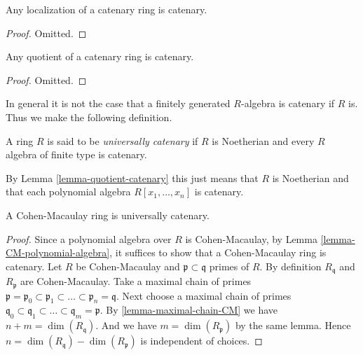 \begin{lemma}
\label{lemma-localization-catenary}
Any localization of a catenary ring is catenary.
\end{lemma}

\begin{proof}
Omitted.
\end{proof}

\begin{lemma}
\label{lemma-quotient-catenary}
Any quotient of a catenary ring is catenary.
\end{lemma}

\begin{proof}
Omitted.
\end{proof}

\noindent
In general it is not the case that a finitely generated
$R$-algebra is catenary if $R$ is. Thus we make the following
definition.

\begin{definition}
\label{definition-universally-catenary}
A ring $R$ is said to be {\it universally catenary}
if $R$ is Noetherian and every $R$ algebra of finite
type is catenary.
\end{definition}

\noindent
By Lemma \ref{lemma-quotient-catenary}
this just means that $R$ is Noetherian
and that each polynomial algebra $R[x_1, \ldots, x_n]$
is catenary.

\begin{lemma}
\label{lemma-CM-ring-catenary}
A Cohen-Macaulay ring is universally catenary.
\end{lemma}

\begin{proof}
Since a polynomial algebra over $R$ is Cohen-Macaulay,
by Lemma \ref{lemma-CM-polynomial-algebra},
it suffices to show that a Cohen-Macaulay ring is
catenary.
Let $R$ be Cohen-Macaulay and $\mathfrak p \subset \mathfrak q$
primes of $R$. By definition $R_{\mathfrak q}$ and
$R_{\mathfrak p}$ are Cohen-Macaulay.
Take a maximal chain of primes
$\mathfrak p = \mathfrak p_0 \subset \mathfrak p_1 \subset
\ldots \subset \mathfrak p_n = \mathfrak q$.
Next choose a maximal chain of primes
$\mathfrak q_0 \subset \mathfrak q_1 \subset \ldots \subset
\mathfrak q_m = \mathfrak p$.
By \ref{lemma-maximal-chain-CM} we have
$n + m = \dim(R_{\mathfrak q})$. And we have
$m = \dim(R_{\mathfrak p})$ by the same lemma.
Hence $n = \dim(R_{\mathfrak q}) - \dim(R_{\mathfrak p})$
is independent of choices.
\end{proof}















